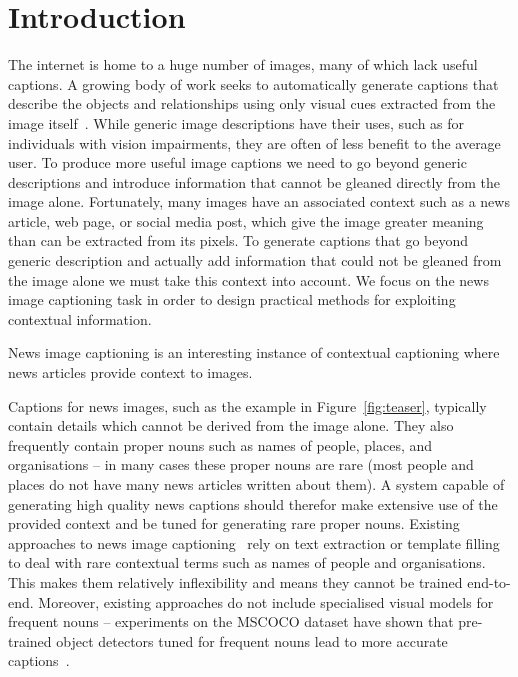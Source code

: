 
\section{Introduction}



The internet is home to a huge number of images, many of which lack useful
captions. A growing body of work seeks to automatically generate captions that
describe the objects and relationships using only visual cues extracted from
the image itself~\cite{Donahue2015LongTR, Vinyals2015ShowAT, Fang2015FromCT,
Karpathy2015DeepVA, Rennie2017SelfCriticalST, Lu2017KnowingWT,
Anderson2017BottomUpAT, Cornia2019ShowCT}. While generic image descriptions
have their uses, such as for individuals with vision impairments, they are
often of less benefit to the average user. To produce more useful image
captions we need to go beyond generic descriptions and introduce information
that cannot be gleaned directly from the image alone. Fortunately, many images
have an associated context such as a news article, web page, or social
media post, which give the image greater meaning than can be extracted from its
pixels. To generate captions that go beyond generic description and actually
add information that could not be gleaned from the image alone we must take
this context into account. We focus on the news image captioning task in order
to design practical methods for exploiting contextual information.


News image captioning is an interesting instance of contextual captioning
where news articles provide context to images.

Captions for news images, such as the example in Figure~\ref{fig:teaser},
typically contain details which cannot be derived from the image alone. They
also frequently contain proper nouns such as names of people, places, and
organisations -- in many cases these proper nouns are rare (most people and
places do not have many news articles written about them). A system capable of
generating high quality news captions should therefor make extensive use of the
provided context and be tuned for generating rare proper nouns. Existing
approaches to news image captioning~\cite{Tariq2017ACE,
Ramisa2016BreakingNewsAA,
	Biten2019GoodNews}  rely on text extraction or
template filling to deal with rare contextual terms such as names of people and
organisations. This makes them relatively inflexibility and means they cannot
be trained end-to-end. Moreover, existing approaches do not include specialised
visual models for frequent nouns -- experiments on the MSCOCO dataset have
shown
that pre-trained object detectors tuned for frequent nouns
lead to more accurate captions~\cite{}.

